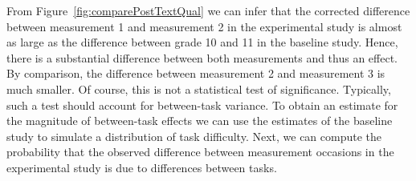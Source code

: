 \documentclass[a4paper]{article}
\begin{document}
From Figure~\ref{fig:comparePostTextQual} we can infer that the corrected difference between measurement 1 and measurement 2 in the experimental study is almost as large as the difference between grade 10 and 11 in the baseline study. Hence, there is a substantial difference between both measurements and thus an effect. By comparison, the difference between measurement 2 and measurement 3 is much smaller. Of course, this is not a statistical test of significance. Typically, such a test should account for between-task variance. To obtain an estimate for the magnitude of between-task effects we can use the estimates of the baseline study to simulate a distribution of task difficulty. Next, we can compute the probability that the observed difference between measurement occasions in the experimental study is due to differences between tasks.
\end{document}
